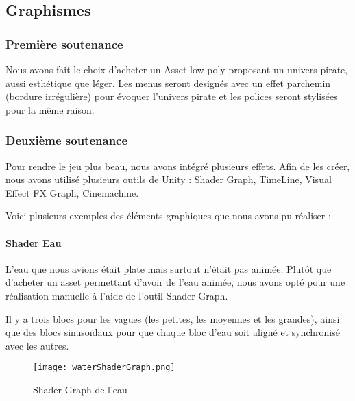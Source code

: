 \subsection{Graphismes}

    \vspace{0.5cm}
    \subsubsection{Première soutenance}
    \vspace{0.5cm}

        Nous avons fait le choix d'acheter un Asset low-poly proposant un univers pirate, aussi esthétique que léger. Les menus seront 
        designés avec un effet parchemin (bordure irrégulière) pour évoquer l'univers pirate et les polices seront stylisées pour la même raison. 
        

    \vspace{0.5cm}
    \subsubsection{Deuxième soutenance}
    \vspace{0.5cm}

        Pour rendre le jeu plus beau, nous avons intégré plusieurs effets.
        Afin de les créer, nous avons utilisé plusieurs outils de Unity :
        Shader Graph, TimeLine, Visual Effect FX Graph, Cinemachine.

        Voici plusieurs exemples des éléments graphiques que nous avons pu réaliser : 

        \paragraph{Shader Eau}

        L'eau que nous avions était plate mais surtout n'était pas animée.
        Plutôt que d'acheter un asset permettant d'avoir de l'eau animée,
        nous avons opté pour une réalisation manuelle à l'aide de l'outil Shader Graph.

        Il y a trois blocs pour les vagues (les petites, les moyennes et les grandes),
        ainsi que des blocs sinusoïdaux pour que chaque bloc d'eau soit aligné et synchronisé avec les autres.
        \begin{figure}[hbt!]
            \centering
            \texttt{[image: waterShaderGraph.png]}
            \caption{Shader Graph de l'eau}
        \end{figure}
        
